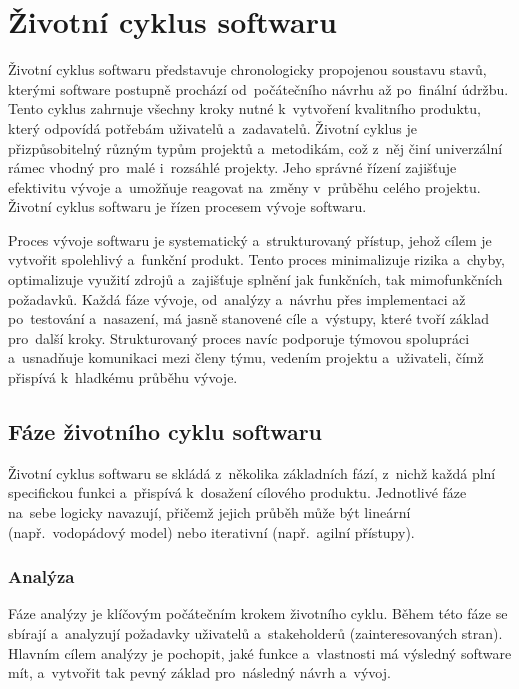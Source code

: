 \documentclass[male,czech,api_bc]{kitheses}
\begin{document}
\section{Životní cyklus softwaru}

Životní cyklus softwaru představuje chronologicky propojenou soustavu stavů, kterými software postupně prochází od~počátečního návrhu až po~finální údržbu. Tento cyklus zahrnuje všechny kroky nutné k~vytvoření kvalitního produktu, který odpovídá potřebám uživatelů a~zadavatelů. Životní cyklus je přizpůsobitelný různým typům projektů a~metodikám, což z~něj činí univerzální rámec vhodný pro~malé i~rozsáhlé projekty. Jeho správné řízení zajišťuje efektivitu vývoje a~umožňuje reagovat na~změny v~průběhu celého projektu. Životní cyklus softwaru je řízen procesem vývoje softwaru.

Proces vývoje softwaru je systematický a~strukturovaný přístup, jehož cílem je vytvořit spolehlivý a~funkční produkt. Tento proces minimalizuje rizika a~chyby, optimalizuje využití zdrojů a~zajišťuje splnění jak funkčních, tak mimofunkčních požadavků. Každá fáze vývoje, od~analýzy a~návrhu přes implementaci až po~testování a~nasazení, má jasně stanovené cíle a~výstupy, které tvoří základ pro~další kroky. Strukturovaný proces navíc podporuje týmovou spolupráci a~usnadňuje komunikaci mezi členy týmu, vedením projektu a~uživateli, čímž přispívá k~hladkému průběhu vývoje.

\subsection{Fáze životního cyklu softwaru}

Životní cyklus softwaru se skládá z~několika základních fází, z~nichž každá plní specifickou funkci a~přispívá k~dosažení cílového produktu. Jednotlivé fáze na~sebe logicky navazují, přičemž jejich průběh může být lineární (např.~vodopádový model) nebo iterativní (např.~agilní přístupy).\cite{softwaroveInzenyrstviSem1}

\subsubsection{Analýza}

Fáze analýzy je klíčovým počátečním krokem životního cyklu. Během této fáze se sbírají a~analyzují požadavky uživatelů a~stakeholderů (zainteresovaných stran). Hlavním cílem analýzy je pochopit, jaké funkce a~vlastnosti má výsledný software mít, a~vytvořit tak pevný základ pro~následný návrh a~vývoj.
\end{document}

